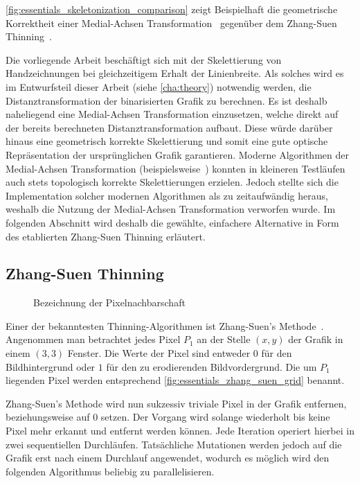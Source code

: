 \autoref{fig:essentials_skeletonization_comparison} zeigt Beispielhaft die geometrische Korrektheit einer Medial-Achsen Transformation~\cite{scikit-image} gegenüber dem Zhang-Suen Thinning~\cite{DBLP:journals/cacm/ZhangS84}.

Die vorliegende Arbeit beschäftigt sich mit der Skelettierung von Handzeichnungen bei gleichzeitigem Erhalt der Linienbreite.
Als solches wird es im Entwurfsteil dieser Arbeit (siehe \autoref{cha:theory}) notwendig werden, die Distanztransformation der binarisierten Grafik zu berechnen.
Es ist deshalb naheliegend eine Medial-Achsen Transformation einzusetzen, welche direkt auf der bereits berechneten Distanztransformation aufbaut.
Diese würde darüber hinaus eine geometrisch korrekte Skelettierung und somit eine gute optische Repräsentation der ursprünglichen Grafik garantieren.
Moderne Algorithmen der Medial-Achsen Transformation (beispielsweise~\cite{DBLP:journals/cg/MonteroL12}) konnten in kleineren Testläufen auch stets topologisch korrekte Skelettierungen erzielen.
Jedoch stellte sich die Implementation solcher modernen Algorithmen als zu zeitaufwändig heraus, weshalb die Nutzung der Medial-Achsen Transformation verworfen wurde.
Im folgenden Abschnitt wird deshalb die gewählte, einfachere Alternative in Form des etablierten Zhang-Suen Thinning erläutert.

\subsection{Zhang-Suen Thinning}%
\label{subsec:essentials_skeletonization_zhang_suen}

\wrapfigurefix{0bp}
\begin{figure}
    \centering
    
    \caption{Bezeichnung der Pixelnachbarschaft}%
    \label{fig:essentials_zhang_suen_grid}
\end{figure}
Einer der bekanntesten Thinning-Algorithmen ist Zhang-Suen's Methode~\cite{DBLP:journals/cacm/ZhangS84}.
Angenommen man betrachtet jedes Pixel \(P_1\) an der Stelle \((x,y)\) der Grafik in einem \((3,3)\) Fenster.
Die Werte der Pixel sind entweder \(0\) für den Bildhintergrund oder \(1\) für den zu erodierenden Bildvordergrund.
Die um \(P_1\) liegenden Pixel werden entsprechend \autoref{fig:essentials_zhang_suen_grid} benannt.
\wrapfigureunfix{}

Zhang-Suen's Methode wird nun sukzessiv triviale Pixel in der Grafik entfernen, beziehungsweise auf \(0\) setzen.
Der Vorgang wird solange wiederholt bis keine Pixel mehr erkannt und entfernt werden können.
Jede Iteration operiert hierbei in zwei sequentiellen Durchläufen.
Tatsächliche Mutationen werden jedoch auf die Grafik erst nach einem Durchlauf angewendet, wodurch es möglich wird den folgenden Algorithmus beliebig zu parallelisieren.

